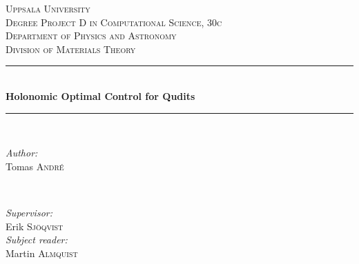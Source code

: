 \documentclass[a4paper, 12pt]{article}
\newcommand{\HRule}{\rule{\linewidth}{0.5mm}} %
\begin{document}
\begin{titlepage}


\center %
 
 
 
 

\textsc{\LARGE Uppsala University}\\[1.5cm] %
\textsc{\Large Degree Project D in Computational Science, 30c}\\[0.5cm] %
\textsc{\large Department of Physics and Astronomy\\ Division of Materials Theory}\\[0.5cm] %


\HRule \\[0.4cm]
{ \huge \bfseries Holonomic Optimal Control for Qudits}\\[0.4cm] %
\HRule \\[1.5cm]
 

\begin{minipage}{0.4\textwidth}
\begin{flushleft} \large
\emph{Author:}\\
Tomas \textsc{André} %
\end{flushleft}
\end{minipage}
~
\begin{minipage}{0.4\textwidth}
\begin{flushright} \large
\emph{Supervisor:} \\
Erik \textsc{Sjöqvist} \\
\emph{Subject reader:} \\
Martin \textsc{Almquist} %
\end{flushright}
\end{minipage}\\[2cm]


\end{titlepage}
\end{document}

